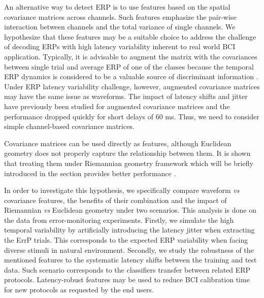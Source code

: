 \documentclass[12pt]{iopart}
\begin{document}
An alternative way to detect ERP is to use features based on the spatial covariance matrices across channels. Such
features emphasize the pair-wise interaction
between channels and the total variance of single channels.
We hypothesize that these features may be a suitable choice
to address the challenge of decoding ERPs with high latency variability 
inherent to real world BCI application.
Typically, it is advisable to augment the matrix
with the covariances between single trial and average ERP
of one of the classes because the temporal ERP dynamics is considered to be
a valuable source of discriminant information \cite{congedo_new_2013,barachant_plug&play_2014}.
Under ERP latency variability challenge, however, 
augmented covariance matrices may have the same issue as
waveforms.
The impact of latency shifts and jitter have previously been studied
for augmented covariance matrices \cite{barachant_plug&play_2014}
and the performance dropped quickly for short delays of 60 ms.
Thus, we need to consider simple channel-based covariance matrices.

Covariance matrices can be used directly \cite{tomioka_classifying_2007} as features, 
although Euclidean geometry does not properly capture the relationship between them.
It is shown that treating them under Riemannian geometry framework
which will be briefly introduced in the section 
provides better performance \cite{barachant_classification_2013, zanini_transfer_2018}.


In order to investigate this hypothesis,
we specifically compare waveform \textit{vs} covariance features,
the benefits of their combination
and the impact of Riemannian \textit{vs} Euclidean geometry under two scenarios.
This analysis is done on the data from error-monitoring experiments.
Firstly, we simulate the high temporal
variability by artificially introducing the latency jitter when extracting the ErrP trials.
This corresponds to the expected ERP variability when facing diverse stimuli in
natural environment.
Secondly, we study the robustness of the mentioned features
to the systematic latency shifts between the training and test data. 
Such scenario corresponds to the classifiers transfer between
related ERP protocols. Latency-robust features may be used to reduce BCI calibration time
for new protocols as requested by the end users.
\end{document}
